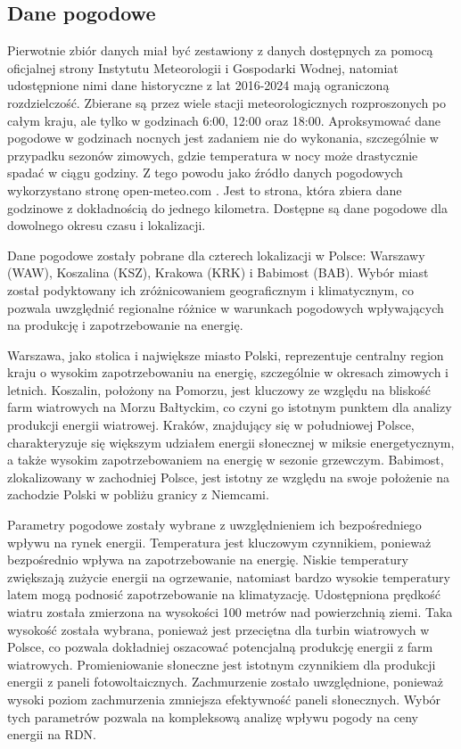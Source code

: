 \subsection{Dane pogodowe}
Pierwotnie zbiór danych miał być zestawiony z danych dostępnych za pomocą oficjalnej strony Instytutu Meteorologii i Gospodarki Wodnej, natomiat udostępnione nimi dane historyczne z lat 2016-2024 mają ograniczoną rozdzielczość. Zbierane są przez wiele stacji meteorologicznych rozproszonych po całym kraju, ale tylko w godzinach 6:00, 12:00 oraz 18:00. Aproksymować dane pogodowe w godzinach nocnych jest zadaniem nie do wykonania, szczególnie w przypadku sezonów zimowych, gdzie temperatura w nocy może drastycznie spadać w ciągu godziny. Z tego powodu jako źródło danych pogodowych wykorzystano stronę open-meteo.com \cite{METEO}. Jest to strona, która zbiera dane godzinowe z dokładnością do jednego kilometra. Dostępne są dane pogodowe dla dowolnego okresu czasu i lokalizacji.

Dane pogodowe zostały pobrane dla czterech lokalizacji w Polsce: Warszawy (WAW), Koszalina (KSZ), Krakowa (KRK) i Babimost (BAB). Wybór miast został podyktowany ich zróżnicowaniem geograficznym i klimatycznym, co pozwala uwzględnić regionalne różnice w warunkach pogodowych wpływających na produkcję i zapotrzebowanie na energię. 

Warszawa, jako stolica i największe miasto Polski, reprezentuje centralny region kraju o wysokim zapotrzebowaniu na energię, szczególnie w okresach zimowych i letnich. Koszalin, położony na Pomorzu, jest kluczowy ze względu na bliskość farm wiatrowych na Morzu Bałtyckim, co czyni go istotnym punktem dla analizy produkcji energii wiatrowej. Kraków, znajdujący się w południowej Polsce, charakteryzuje się większym udziałem energii słonecznej w miksie energetycznym, a także wysokim zapotrzebowaniem na energię w sezonie grzewczym. Babimost, zlokalizowany w zachodniej Polsce, jest istotny ze względu na swoje położenie na zachodzie Polski w pobliżu granicy z Niemcami.

Parametry pogodowe zostały wybrane z uwzględnieniem ich bezpośredniego wpływu na rynek energii.\newline
Temperatura jest kluczowym czynnikiem, ponieważ bezpośrednio wpływa na zapotrzebowanie na energię. Niskie temperatury zwiększają zużycie energii na ogrzewanie, natomiast bardzo wysokie temperatury latem mogą podnosić zapotrzebowanie na klimatyzację.\newline
Udostępniona prędkość wiatru została zmierzona na wysokości 100 metrów nad powierzchnią ziemi. Taka wysokość została wybrana, ponieważ jest przeciętna dla turbin wiatrowych w Polsce, co pozwala dokładniej oszacować potencjalną produkcję energii z farm wiatrowych.\newline
Promieniowanie słoneczne jest istotnym czynnikiem dla produkcji energii z paneli fotowoltaicznych.\newline
Zachmurzenie zostało uwzględnione, ponieważ wysoki poziom zachmurzenia zmniejsza efektywność paneli słonecznych. 
Wybór tych parametrów pozwala na kompleksową analizę wpływu pogody na ceny energii na RDN.

